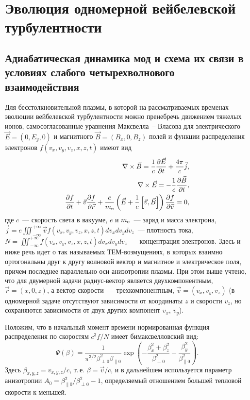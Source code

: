 \chapter{Эволюция одномерной вейбелевской турбулентности}\label{ch:ch1}
\section{Адиабатическая динамика мод и схема их связи в условиях слабого четырехволнового взаимодействия}\label{sec:ch1/sec1}

Для бесстолкновительной плазмы, в которой на рассматриваемых временах эволюции вейбелевской турбулентности можно пренебречь движением тяжелых ионов, самосогласованные уравнения  Максвелла~-- Власова для электрического $\vec{E}=(0, E_y, 0)$ и магнитного $\vec{B}=(B_x, 0, B_z)$ полей и функции распределения электронов $f(v_x , v_y , v_z, x, z, t)$ имеют вид
\begin{align}
    \nabla \times \vec{B}=\dfrac{1}{c}\dfrac{\partial \vec{E}}{\partial t}+\dfrac{4\pi}{c}\vec{j}, \\
    \nabla \times \vec{E}=-\dfrac{1}{c}\dfrac{\partial \vec{B}}{\partial t}, \\
    \dfrac{\partial f}{\partial t}+\vec{v}\dfrac{\partial f}{\partial \vec{r}}+\dfrac{e}{m_\mathrm{e}} \left(\vec{E}+\dfrac{1}{c}\left[\vec{v},\vec{B}\right]\right) \dfrac{\partial f}{\partial \vec{v}}=0,
\end{align}
где $c$~--- скорость света в вакууме, $e$ и $m_\mathrm{e}$~--- заряд и масса электрона, $\vec{j}=e\iiint^{+\infty}_{-\infty}\vec{v}f(v_x , v_y , v_z, x, z, t) dv_x dv_ydv_z$~--- плотность тока, $N=\iiint^{+\infty}_{-\infty}f(v_x , v_y , v_z , x, z, t)dv_xdv_ydv_z$~--- концентрация электронов. Здесь и ниже речь идет о так называемых ТЕМ-возмущениях, в которых взаимно ортогональны друг к другу волновой вектор и магнитное и электрическое поля, причем последнее параллельно оси анизотропии плазмы. При этом выше учтено, что для двумерной задачи радиус-вектор является двухкомпонентным, $\vec{r}=(x , 0 , z)$, а вектор скорости~--- трехкомпонентным,  $\vec{v}=(v_x , v_y ,v_z)$ (в одномерной задаче отсутствуют зависимости от координаты $z$ и скорости $v_z$, но сохраняются зависимости от двух других компонент $v_x$, $v_y$). 

Положим, что в начальный момент времени нормированная функция распределения по скоростям $c^3f/N$ имеет бимаксвелловский вид:
\begin{equation}
\label{bimax}
\Psi(\beta)=\dfrac{1}{\pi^{3/2}\beta_{\perp0}^2 \beta_{\|0} } \exp\left(-\dfrac{\beta_x^2+\beta_z^2}{\beta_{\perp0}^2}-\dfrac{\beta_y^2}{\beta_{\|0}^2}\right).
\end{equation}
Здесь $\beta_{x,y,z}={v_{x,y,z}}/{c}$, т.\,е. $\beta=\vec{v}/{c}$, и в дальнейшем используется параметр анизотропии $A_0={\beta^2_{\|0}}/{\beta^2_{\perp0}}-1$, определяемый отношением большей тепловой скорости к меньшей.

